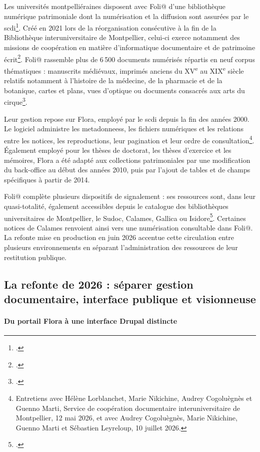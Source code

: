 Les universités montpelliéraines disposent avec Foli@ d'une bibliothèque numérique patrimoniale dont la numérisation et la diffusion sont assurées par le \gls{scdi}\footcite{SCDIFolia}. Créé en 2021 lors de la réorganisation consécutive à la fin de la Bibliothèque interuniversitaire de Montpellier, celui-ci exerce notamment des missions de coopération en matière d'informatique documentaire et de patrimoine écrit\footcite{SCDI2021}. Foli@ rassemble plus de 6\,500 documents numérisés répartis en neuf corpus thématiques : manuscrits médiévaux, imprimés anciens du XV\textsuperscript{e} au XIX\textsuperscript{e} siècle relatifs notamment à l'histoire de la médecine, de la pharmacie et de la botanique, cartes et plans, vues d'optique ou documents consacrés aux arts du cirque\footcite{Vanjak2026}.

Leur gestion repose sur Flora, employé par le \gls{scdi} depuis la fin des années 2000. Le logiciel administre les \glspl{metadonnees}, les fichiers numériques et les relations entre les notices, les reproductions, leur pagination et leur ordre de consultation\footnote{Entretiens avec Hélène Lorblanchet, Marie Nikichine, Audrey Cogoluègnès et Guenno Marti, Service de coopération documentaire interuniversitaire de Montpellier, 12 mai 2026, et avec Audrey Cogoluègnès, Marie Nikichine, Guenno Marti et Sébastien Leyreloup, 10 juillet 2026.}. Également employé pour les thèses de doctorat, les thèses d'exercice et les mémoires, Flora a été adapté aux collections patrimoniales par une modification du back-office au début des années 2010, puis par l'ajout de tables et de champs spécifiques à partir de 2014.

Foli@ complète plusieurs dispositifs de \gls{signalement} : ses ressources sont, dans leur quasi-totalité, également accessibles depuis le catalogue des bibliothèques universitaires de Montpellier, le Sudoc, Calames, Gallica ou Isidore\footcite{Vanjak2026}. Certaines notices de Calames renvoient ainsi vers une numérisation consultable dans Foli@. La refonte mise en production en juin 2026 accentue cette circulation entre plusieurs environnements en séparant l'administration des ressources de leur restitution publique.


\subsection{La refonte de 2026 : séparer gestion documentaire, interface publique et visionneuse}

\paragraph{Du portail Flora à une interface Drupal distincte}

